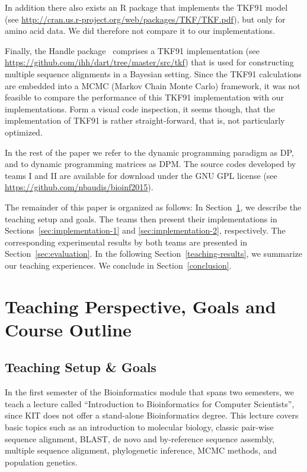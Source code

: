 \documentclass[runningheads,a4paper]{llncs}
\begin{document}
In addition there also exists an R package  that implements the TKF91 model (see \url{http://cran.us.r-project.org/web/packages/TKF/TKF.pdf}), but only for amino acid data.
We did therefore not compare it to our implementations.

Finally, the Handle package~\cite{holmes2001evolutionary} comprises a TKF91 implementation  (see \url{https://github.com/ihh/dart/tree/master/src/tkf}) that is 
used for constructing multiple sequence alignments in a Bayesian setting. Since the TKF91 calculations are embedded into a MCMC (Markov Chain Monte Carlo) framework, 
it was not feasible to compare the performance of this TKF91 implementation with our implementations. Form a visual code inspection, it seems though, 
that the implementation of TKF91 is rather straight-forward, that is, not particularly optimized.

In the rest of the paper we refer to the dynamic programming paradigm as DP, and to dynamic programming matrices as DPM.
The source codes developed by teams I and II are available for download  under the GNU GPL license (see \url{https://github.com/nbaudis/bioinf2015}).

The remainder of this paper is organized as follows: In Section~\ref{teaching}, we describe the teaching setup and goals.
The teams then present their implementations in Sections~\ref{sec:implementation-1} and \ref{sec:implementation-2}, respectively.
The corresponding experimental results by both teams are presented in Section~\ref{sec:evaluation}.
In the following Section~\ref{teaching-results}, we summarize our teaching experiences.
We conclude in Section~\ref{conclusion}.

\section{Teaching Perspective, Goals and Course Outline}
\label{teaching}

\subsection{Teaching Setup \& Goals}
\label{setup}

In the first semester of the Bioinformatics module that spans two semesters, 
we teach a lecture called ``Introduction to Bioinformatics for Computer Scientists'', since KIT does not offer
a stand-alone Bioinformatics degree. This lecture covers basic topics such as an introduction to molecular biology, classic pair-wise sequence alignment,
BLAST, de novo and by-reference sequence assembly, multiple sequence alignment, phylogenetic inference, MCMC methods, and population genetics.
\end{document}
